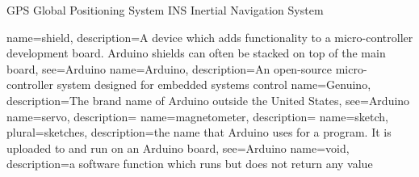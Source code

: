 %
%

{GPS}
{Global Positioning System}
{INS}
{Inertial Navigation System}

{name=shield,
description={A device which adds functionality to a micro-controller development board. Arduino shields can often be stacked on top of the main board},
see={Arduino}
}
{name=Arduino,
description={An open-source micro-controller system designed for embedded systems control}
}
{name=Genuino,
description={The brand name of Arduino outside the United States},
see={Arduino}
}
{name=servo,
description={}
}
{name=magnetometer,
description={}
}
{name=sketch,
plural={sketches},
description={the name that Arduino uses for a program. It is uploaded to and run on an Arduino board},
see={Arduino}
}
{name=void,
description={a software function which runs but does not return any value}
}
